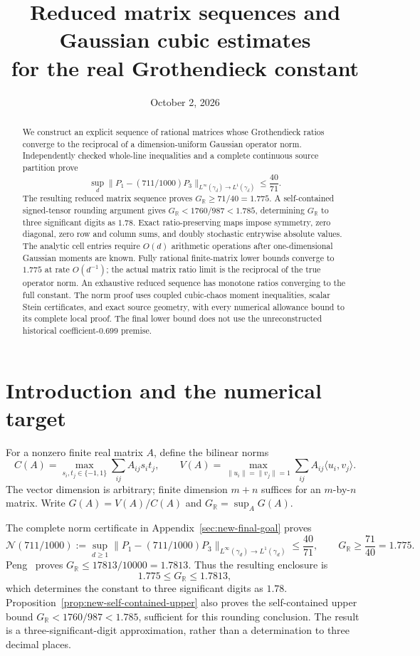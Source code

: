 \documentclass[11pt]{article}
\title{Reduced matrix sequences and Gaussian cubic estimates\\for the real Grothendieck constant}
\author{}
\date{October 2, 2026}
\newcommand{\R}{\mathbb R}
\newcommand{\GR}{G_{\R}}
\newcommand{\ip}[2]{\langle #1,#2\rangle}
\newcommand{\norm}[1]{\lVert #1\rVert}
\newcommand{\N}{\mathcal N}
\begin{document}
\maketitle
\begin{abstract}
We construct an explicit sequence of rational matrices whose Grothendieck
ratios converge to the reciprocal of a dimension-uniform Gaussian operator
norm. Independently checked whole-line inequalities and a complete continuous
source partition prove
\[
 \sup_d\|P_1-(711/1000)P_3\|_{L^\infty(\gamma_d)\to L^1(\gamma_d)}
 \le\frac{40}{71}.
\]
The resulting reduced matrix sequence proves $\GR\ge71/40=1.775$.
A self-contained signed-tensor rounding argument gives
$\GR<1760/987<1.785$, determining $\GR$ to three significant digits
as $1.78$. Exact ratio-preserving maps impose symmetry, zero diagonal,
zero row and column sums, and doubly stochastic entrywise absolute values.
The analytic cell entries require $O(d)$ arithmetic operations after
one-dimensional Gaussian moments are known. Fully rational finite-matrix
lower bounds converge to $1.775$ at rate $O(d^{-1})$; the actual matrix
ratio limit is the reciprocal of the true operator norm. An exhaustive
reduced sequence has monotone ratios converging to the full constant.
The norm proof uses coupled cubic-chaos moment inequalities, scalar Stein
certificates, and exact source geometry, with every numerical allowance
bound to its complete local proof. The final lower bound does not use the
unreconstructed historical coefficient-$0.699$ premise.
\end{abstract}

\section{Introduction and the numerical target}
For a nonzero finite real matrix $A$, define the bilinear norms
\[
 C(A)=\max_{s_i,t_j\in\{-1,1\}}\sum_{ij}A_{ij}s_it_j,
 \qquad
 V(A)=\max_{\norm{u_i}=\norm{v_j}=1}
                 \sum_{ij}A_{ij}\ip{u_i}{v_j}.
\]
The vector dimension is arbitrary; finite dimension $m+n$ suffices for an
$m$-by-$n$ matrix. Write $G(A)=V(A)/C(A)$ and
$\GR=\sup_A G(A)$.

The complete norm certificate in
Appendix~\ref{sec:new-final-goal} proves
\begin{equation}\label{eq:new-final-headline}
 \N(711/1000):=
 \sup_{d\geq1}\|P_1-(711/1000)P_3\|_{L^\infty(\gamma_d)\to L^1(\gamma_d)}
 \leq\frac{40}{71},\qquad
 \GR\geq\frac{71}{40}=1.775.
\end{equation}
Peng~\cite{peng} proves $\GR\leq17813/10000=1.7813$.
Thus the resulting enclosure is
\[
 1.775\leq\GR\leq1.7813,
\]
which determines the constant to three significant digits as $1.78$.
Proposition~\ref{prop:new-self-contained-upper} also proves the
self-contained upper bound $\GR<1760/987<1.785$, sufficient for
this rounding conclusion. The result is a three-significant-digit
approximation, rather than a determination to three decimal places.
\end{document}
